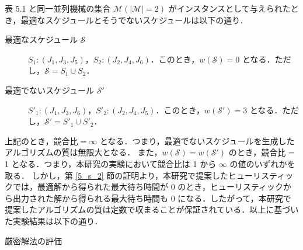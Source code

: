 \documentclass[12pt]{optlab-bachelor}
\begin{document}
表 5.1 と同一並列機械の集合 $\mathcal{M} (|\mathcal{M}| = 2)$ がインスタンスとして与えられたとき，最適なスケジュールとそうでないスケジュールは以下の通り．
\begin{description}
  \item[最適なスケジュール $\mathcal{S}$] $S_1 : (J_1, J_3, J_5)$，$S_2 : (J_2, J_4, J_6)$．このとき，$w(\mathcal{S}) = 0$ となる．ただし，$\mathcal{S} = S_1 \cup S_2$．
  \item[最適でないスケジュール $\mathcal{S}'$] $S'_1 : (J_1, J_3, J_6)$，$S'_2 : (J_2, J_4, J_5)$．このとき，$w(\mathcal{S}') = 3$ となる．ただし，$\mathcal{S}' = S'_1 \cup S'_2$．
\end{description}

上記のとき，$\text{競合比} = \infty$ となる．つまり，最適でないスケジュールを生成したアルゴリズムの質は無限大となる．
また，$w(\mathcal{S}) = w(\mathcal{S}')$ のとき，競合比 = 1 となる．つまり，本研究の実験において競合比は 1 から $\infty$ の値のいずれかを取る．
しかし，第 \ref{5_s_2} 節の証明より，本研究で提案したヒューリスティックでは，最適解から得られた最大待ち時間が 0 のとき，ヒューリスティックから出力された解から得られる最大待ち時間も 0 になる．したがって，本研究で提案したアルゴリズムの質は定数で収まることが保証されている．以上に基づいた実験結果は以下の通り．

\begin{description}
  \item[厳密解法の評価]
\end{description}
\end{document}
